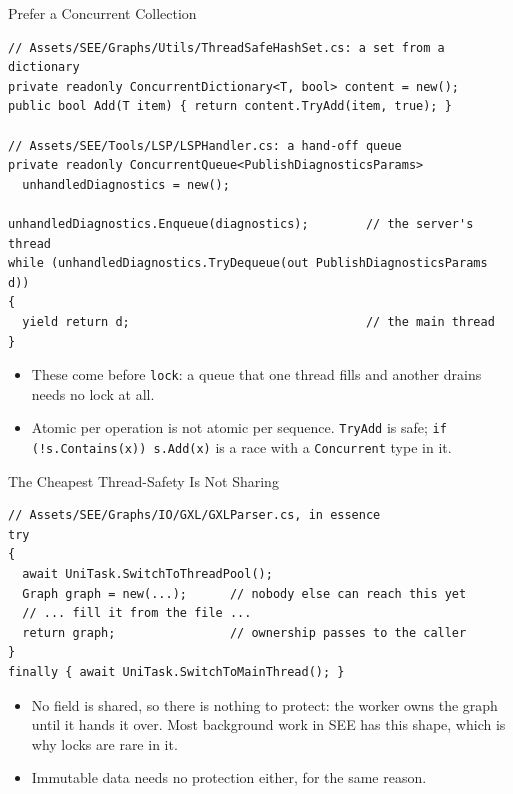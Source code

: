 \begin{frame}[fragile]{Prefer a Concurrent Collection}
  \begin{lstlisting}[basicstyle=\scriptsize\ttfamily]
// Assets/SEE/Graphs/Utils/ThreadSafeHashSet.cs: a set from a dictionary
private readonly ConcurrentDictionary<T, bool> content = new();
public bool Add(T item) { return content.TryAdd(item, true); }

// Assets/SEE/Tools/LSP/LSPHandler.cs: a hand-off queue
private readonly ConcurrentQueue<PublishDiagnosticsParams>
  unhandledDiagnostics = new();

unhandledDiagnostics.Enqueue(diagnostics);        // the server's thread
while (unhandledDiagnostics.TryDequeue(out PublishDiagnosticsParams d))
{
  yield return d;                                 // the main thread
}
  \end{lstlisting}
  \vspace{1ex}

  \begin{itemize}
    \item These come before \texttt{lock}: a queue that one thread fills and
      another drains needs no lock at all.
    \item Atomic per operation is not atomic per sequence.
      \texttt{TryAdd} is safe; \texttt{if (!s.Contains(x)) s.Add(x)} is a race
      with a \texttt{Concurrent} type in it.
  \end{itemize}
\end{frame}

\begin{frame}[fragile]{The Cheapest Thread-Safety Is Not Sharing}
  \begin{lstlisting}[basicstyle=\scriptsize\ttfamily]
// Assets/SEE/Graphs/IO/GXL/GXLParser.cs, in essence
try
{
  await UniTask.SwitchToThreadPool();
  Graph graph = new(...);      // nobody else can reach this yet
  // ... fill it from the file ...
  return graph;                // ownership passes to the caller
}
finally { await UniTask.SwitchToMainThread(); }
  \end{lstlisting}
  \vspace{1ex}

  \begin{itemize}
    \item No field is shared, so there is nothing to protect: the worker owns
      the graph until it hands it over. Most background work in SEE has this
      shape, which is why locks are rare in it.
    \item Immutable data needs no protection either, for the same reason.
  \end{itemize}
  \vspace{1ex}

\end{frame}

